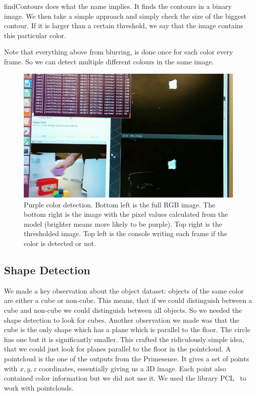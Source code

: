 findContours does what the name implies. It finds the contours in a binary
image. We then take a simple approach and simply check the size of the biggest
contour. If it is larger than a certain threshold, we say that the image
contains this particular color.

Note that everything above from blurring, is done once for each color every
frame. So we can detect multiple different colours in the same image.

\begin{figure}
  \centering
  \includegraphics[width=\linewidth]{images/purpdetect.png}
  \caption{Purple color detection. Bottom left is the full RGB image. The bottom
    right is the image with the pixel values calculated from the model (brighter
    means more likely to be purple). Top right is the thresholded image. Top
    left is the console writing each frame if the color is detected or not.}
  \label{fig:purpledetect}
\end{figure}
\subsection{Shape Detection}
We made a key observation about the object dataset: objects of the same color
are either a cube or non-cube. This means, that if we could distinguish between
a cube and non-cube we could distinguish between all objects. So we needed the
shape detection to look for cubes. Another observation we made was that the cube
is the only shape which has a plane which is parallel to the floor. The circle
has one but it is significantly smaller. This crafted the ridiculously simple
idea, that we could just look for planes parallel to the floor in the
pointcloud. A pointcloud is the one of the outputs from the Primesense. It gives
a set of points with $x,y,z$ coordinates, essentially giving us a 3D image. Each
point also contained color information but we did not use it. We used the
library PCL~\cite{pclorg} to work with pointclouds.

